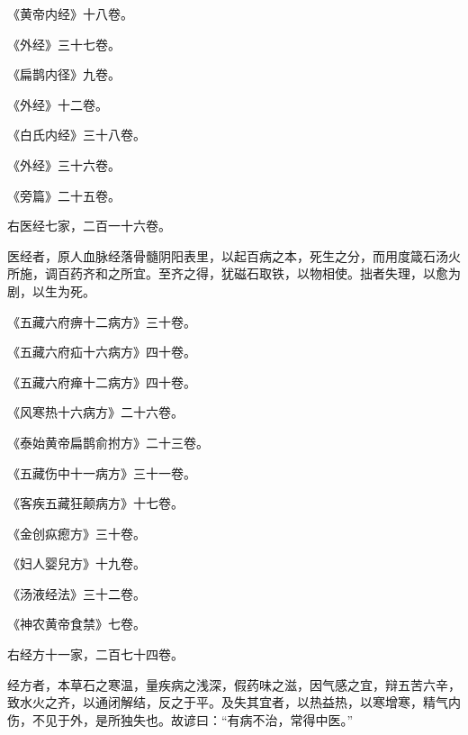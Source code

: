 \documentclass[12pt,UTF8]{ctexbook}
\begin{document}
《黄帝内经》十八卷。



《外经》三十七卷。



《扁鹊内径》九卷。



《外经》十二卷。



《白氏内经》三十八卷。



《外经》三十六卷。



《旁篇》二十五卷。



右医经七家，二百一十六卷。



医经者，原人血脉经落骨髓阴阳表里，以起百病之本，死生之分，而用度箴石汤火所施，调百药齐和之所宜。至齐之得，犹磁石取铁，以物相使。拙者失理，以愈为剧，以生为死。



《五藏六府痹十二病方》三十卷。



《五藏六府疝十六病方》四十卷。



《五藏六府瘅十二病方》四十卷。



《风寒热十六病方》二十六卷。



《泰始黄帝扁鹊俞拊方》二十三卷。



《五藏伤中十一病方》三十一卷。



《客疾五藏狂颠病方》十七卷。



《金创疭瘛方》三十卷。



《妇人婴兒方》十九卷。



《汤液经法》三十二卷。



《神农黄帝食禁》七卷。



右经方十一家，二百七十四卷。



经方者，本草石之寒温，量疾病之浅深，假药味之滋，因气感之宜，辩五苦六辛，致水火之齐，以通闭解结，反之于平。及失其宜者，以热益热，以寒增寒，精气内伤，不见于外，是所独失也。故谚曰：“有病不治，常得中医。”
\end{document}
